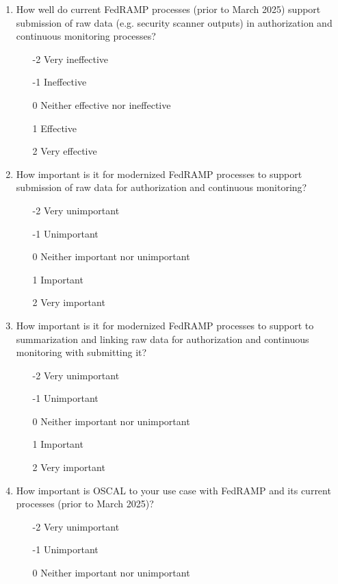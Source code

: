 \documentclass{jdf}
\begin{document}
\begin{enumerate}
\begin{enumerate}
    \end{enumerate}
    \item How well do current FedRAMP processes (prior to March 2025) support submission of raw data (e.g. security scanner outputs) in authorization and continuous monitoring processes?
    \begin{enumerate}
        \item [-2] Very ineffective
        \item [-1] Ineffective
        \item  [0] Neither effective nor ineffective
        \item  [1] Effective 
        \item  [2] Very effective
    \end{enumerate}
    \item How important is it for modernized FedRAMP processes to support submission of raw data for authorization and continuous monitoring?
    \begin{enumerate}
        \item [-2] Very unimportant
        \item [-1] Unimportant
        \item  [0] Neither important nor unimportant
        \item  [1] Important
        \item  [2] Very important
    \end{enumerate}
    \item How important is it for modernized FedRAMP processes to support to summarization and linking raw data for authorization and continuous monitoring with submitting it?
    \begin{enumerate}
        \item [-2] Very unimportant
        \item [-1] Unimportant
        \item  [0] Neither important nor unimportant
        \item  [1] Important
        \item  [2] Very important
    \end{enumerate}
    \item How important is OSCAL to your use case with FedRAMP and its current processes (prior to March 2025)?
    \begin{enumerate}
        \item [-2] Very unimportant
        \item [-1] Unimportant
        \item  [0] Neither important nor unimportant

\end{enumerate}
\end{enumerate}
\end{document}
